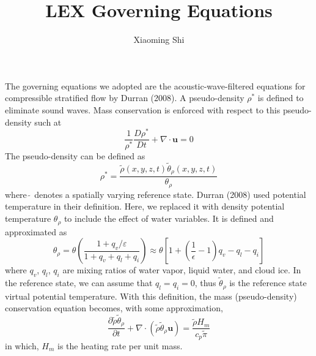 \documentclass[a4paper,11pt]{article}
\title{\textbf{LEX Governing Equations}}
\author{Xiaoming Shi}
\begin{document}
\maketitle

The governing equations we adopted are the acoustic-wave-filtered equations for compressible stratified flow by Durran (2008). A pseudo-density $\rho^*$ is defined to eliminate sound waves. Mass conservation is enforced with respect to this pseudo-density such at
\begin{equation}
 \frac{1}{\rho^*} \frac{D \rho^*}{D t} + \nabla\cdot \mathbf{u} = 0 \nonumber
\end{equation}
The pseudo-density can be defined as 
\begin{equation}
 \rho^* = \frac{\tilde{\rho}(x,y,z,t)\tilde{\theta}_{\rho}(x,y,z,t)}{\theta_{\rho}} \nonumber 
\end{equation}
where $\tilde{\ }$ denotes a spatially varying reference state. Durran (2008) used potential temperature in their definition. Here, we replaced it with density potential temperature $\theta_{\rho}$ to include the effect of water variables. It is defined and approximated as
\begin{equation}
 \theta_{\rho} = \theta\left( \frac{1+ q_v / \varepsilon}{1+q_v+q_l+q_i}  \right)
 \approx \theta\left[ 1+\left(\frac{1}{\epsilon} - 1 \right)q_v - q_l - q_i\right] 
\end{equation}
where $q_v$, $q_l$, $q_i$ are mixing ratios of water vapor, liquid water, and cloud ice. In the reference state,
we can assume that $q_l = q_i = 0$, thus $\tilde{\theta}_{\rho}$ is the reference state virtual potential temperature.
With this definition, the mass (pseudo-density) conservation equation becomes, with some approximation,
\begin{equation}
\frac{\partial \tilde{\rho} \tilde{\theta}_{\rho}}{\partial t} + \nabla\cdot (\tilde{\rho}\tilde{\theta}_{\rho}\mathbf{u}) = \frac{\tilde{\rho} H_m}{c_p \tilde{\pi}}
\end{equation}
in which, $H_m$ is the heating rate per unit mass. 
\end{document}
